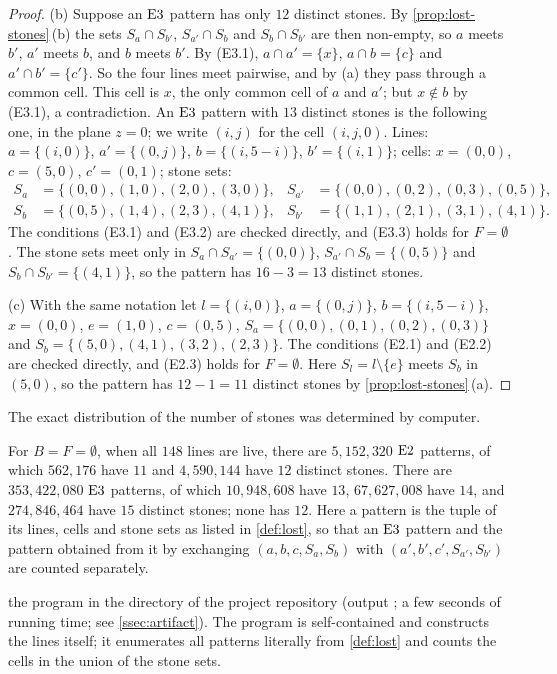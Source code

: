 \begin{proof}
(b) Suppose an $\mathrm{E3}$ pattern has only $12$ distinct stones. By \cref{prop:lost-stones}\,(b) the
sets $S_a\cap S_{b'}$, $S_{a'}\cap S_b$ and $S_b\cap S_{b'}$ are then non-empty, so $a$ meets $b'$, $a'$ meets
$b$, and $b$ meets $b'$. By (E3.1), $a\cap a'=\{x\}$, $a\cap b=\{c\}$ and $a'\cap b'=\{c'\}$. So the four lines
meet pairwise, and by (a) they pass through a common cell. This cell is $x$, the only common cell of $a$ and
$a'$; but $x\notin b$ by (E3.1), a contradiction. An $\mathrm{E3}$ pattern with $13$ distinct stones is the
following one, in the plane $z=0$; we write $(i,j)$ for the cell $(i,j,0)$. Lines:
$a=\{(i,0)\}$, $a'=\{(0,j)\}$, $b=\{(i,5-i)\}$, $b'=\{(i,1)\}$; cells: $x=(0,0)$, $c=(5,0)$, $c'=(0,1)$;
stone sets:
\begin{align*}
S_a&=\{(0,0),(1,0),(2,0),(3,0)\}, & S_{a'}&=\{(0,0),(0,2),(0,3),(0,5)\},\\
S_b&=\{(0,5),(1,4),(2,3),(4,1)\}, & S_{b'}&=\{(1,1),(2,1),(3,1),(4,1)\}.
\end{align*}
The conditions (E3.1) and (E3.2) are checked directly, and (E3.3) holds for $F=\emptyset$. The stone sets
meet only in $S_a\cap S_{a'}=\{(0,0)\}$, $S_{a'}\cap S_b=\{(0,5)\}$ and $S_b\cap S_{b'}=\{(4,1)\}$, so the
pattern has $16-3=13$ distinct stones.

(c) With the same notation let $l=\{(i,0)\}$, $a=\{(0,j)\}$, $b=\{(i,5-i)\}$, $x=(0,0)$, $e=(1,0)$,
$c=(0,5)$, $S_a=\{(0,0),(0,1),(0,2),(0,3)\}$ and $S_b=\{(5,0),(4,1),(3,2),(2,3)\}$. The conditions (E2.1)
and (E2.2) are checked directly, and (E2.3) holds for $F=\emptyset$. Here
$S_l=l\setminus\{e\}$ meets $S_b$ in $(5,0)$, so the pattern has $12-1=11$ distinct stones by
\cref{prop:lost-stones}\,(a).
\end{proof}

The exact distribution of the number of stones was determined by computer.

\begin{fact}\label{fact:e23}
For $B=F=\emptyset$, when all $148$ lines are live, there are $5{,}152{,}320$ $\mathrm{E2}$ patterns, of which
$562{,}176$ have $11$ and $4{,}590{,}144$ have $12$ distinct stones. There are $353{,}422{,}080$ $\mathrm{E3}$
patterns, of which $10{,}948{,}608$ have $13$, $67{,}627{,}008$ have $14$, and $274{,}846{,}464$ have $15$ distinct
stones; none has $12$. Here a pattern is the tuple of its lines, cells and stone sets as listed in
\cref{def:lost}, so that an $\mathrm{E3}$ pattern and the pattern obtained from it by exchanging
$(a,b,c,S_a,S_b)$ with $(a',b',c',S_{a'},S_{b'})$ are counted separately.

\established the program  in the directory  of the project
repository (output ; a few seconds of running time; see \cref{ssec:artifact}). The program is self-contained and constructs the
lines itself; it enumerates all patterns literally from \cref{def:lost} and counts the cells in the
union of the stone sets.
\end{fact}

